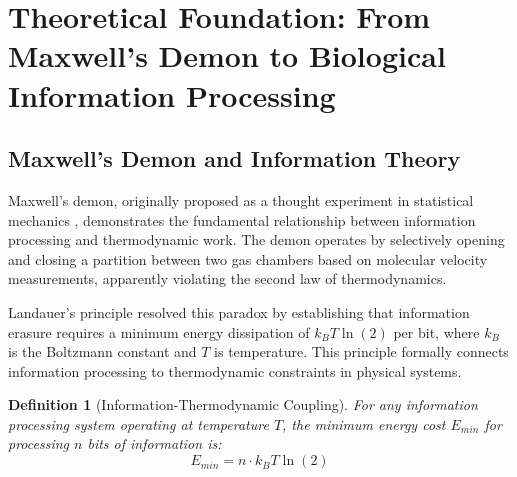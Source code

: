 \documentclass[12pt,a4paper]{article}
\newtheorem{definition}{Definition}[section]
\begin{document}
\tableofcontents

\section{Theoretical Foundation: From Maxwell's Demon to Biological Information Processing}

\subsection{Maxwell's Demon and Information Theory}

Maxwell's demon, originally proposed as a thought experiment in statistical mechanics \citep{maxwell1867theory}, demonstrates the fundamental relationship between information processing and thermodynamic work. The demon operates by selectively opening and closing a partition between two gas chambers based on molecular velocity measurements, apparently violating the second law of thermodynamics.

Landauer's principle \citep{landauer1961irreversibility} resolved this paradox by establishing that information erasure requires a minimum energy dissipation of $k_B T \ln(2)$ per bit, where $k_B$ is the Boltzmann constant and $T$ is temperature. This principle formally connects information processing to thermodynamic constraints in physical systems.

\begin{definition}[Information-Thermodynamic Coupling]
For any information processing system operating at temperature $T$, the minimum energy cost $E_{min}$ for processing $n$ bits of information is:
\begin{equation}
E_{min} = n \cdot k_B T \ln(2)
\end{equation}
\end{definition}
\end{document}
